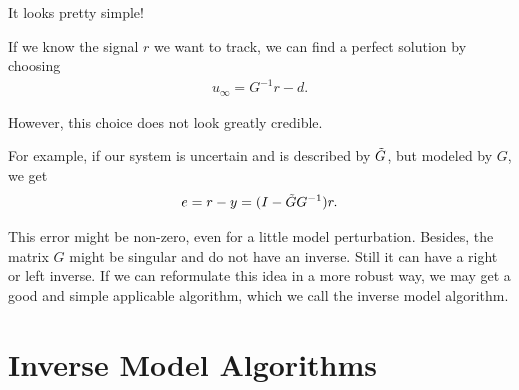 It looks pretty simple! 

If we know the signal $r$ we want to track, we can find a perfect solution by choosing 
\begin{align}
u_\infty = G^{-1} r -d.
\end{align}

However, this choice does not look greatly  credible. 

For example, if our system is uncertain and is described by $\tilde{G}$, but modeled by $G$, we get 
\begin{align}
e = r - y = (I - \tilde{G} G^{-1} ) r. 
\end{align}

This error might be non-zero, even for a little model perturbation. 
Besides, the matrix $G$ might be singular and do not have an inverse.      
Still it can have a right or left inverse. 
If we can reformulate this idea in a more robust way, we may get a good and simple applicable algorithm, which we call the inverse model algorithm.

\section{Inverse Model Algorithms}

